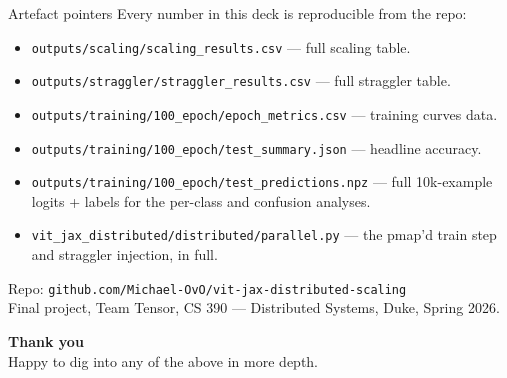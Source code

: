 \documentclass[aspectratio=169,10pt]{beamer}
\begin{document}
\begin{frame}{Artefact pointers}
  \small
  Every number in this deck is reproducible from the repo:
  \begin{itemize}
    \item \texttt{outputs/scaling/scaling\_results.csv} — full scaling table.
    \item \texttt{outputs/straggler/straggler\_results.csv} — full straggler table.
    \item \texttt{outputs/training/100\_epoch/epoch\_metrics.csv} — training curves data.
    \item \texttt{outputs/training/100\_epoch/test\_summary.json} — headline accuracy.
    \item \texttt{outputs/training/100\_epoch/test\_predictions.npz} — full
          10k-example logits + labels for the per-class and confusion analyses.
    \item \texttt{vit\_jax\_distributed/distributed/parallel.py} — the pmap'd train step
          and straggler injection, in full.
  \end{itemize}

  \vspace{0.5em}
  Repo: \texttt{github.com/Michael-OvO/vit-jax-distributed-scaling}\\
  Final project, Team Tensor, CS 390 — Distributed Systems, Duke, Spring 2026.
\end{frame}

\begin{frame}[plain]\begin{center}
  {\huge\bfseries Thank you}\\[0.5em]
  {\normalsize Happy to dig into any of the above in more depth.}
\end{center}\end{frame}
\end{document}
